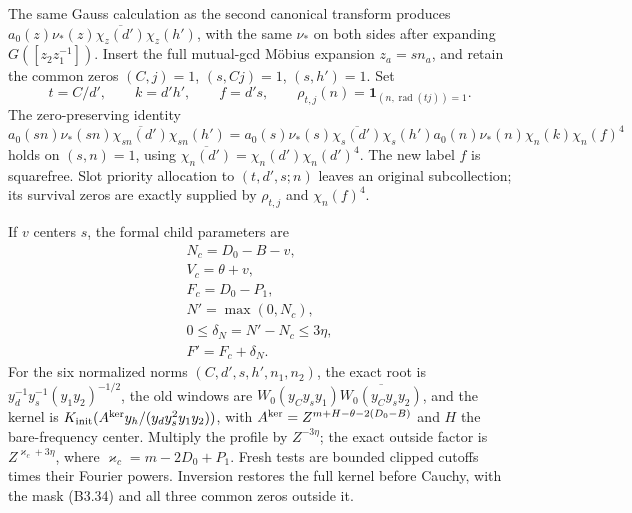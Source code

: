 \documentclass[11pt,a4paper]{article}
\begin{document}
The same Gauss calculation as the second canonical transform produces
\(a_0(z)\nu_*(z)\overline{\chi_z(d')}\chi_z(h')\), with the same
\(\nu_*\) on both sides after expanding \(G([z_2z_1^{-1}])\). Insert the
full mutual-gcd Möbius expansion \(z_a=sn_a\), and retain the common
zeros \((C,\allowbreak{}j)=1\), \((s,\allowbreak{}Cj)=1\), \((s,\allowbreak{}h')=1\). Set \[
t=C/d',\qquad k=d'h',\qquad f=d's,\qquad
\rho_{t,j}(n)=\mathbf1_{(n,\operatorname{rad}(tj))=1}.
\tag{B3.35}
\] The zero-preserving identity \[
a_0(sn)\nu_*(sn)\overline{\chi_{sn}(d')}\chi_{sn}(h')
=a_0(s)\nu_*(s)\overline{\chi_s(d')}\chi_s(h')
 a_0(n)\nu_*(n)\chi_n(k)\chi_n(f)^4
\tag{B3.36}
\] holds on \((s,\allowbreak{}n)=1\), using
\(\overline{\chi_n(d')}=\chi_n(d')\chi_n(d')^4\). The new label \(f\) is
squarefree. Slot priority allocation to \((t,\allowbreak{}d',\allowbreak{}s;n)\) leaves an
original subcollection; its survival zeros are exactly supplied by
\(\rho_{t,\allowbreak{}j}\) and \(\chi_n(f)^4\).

If \(v\) centers \(s\), the formal child parameters are \[
\begin{gathered}
N_c=D_0-B-v,\\ V_c=\theta+v,\\ F_c=D_0-P_1,
\\ N'=\max(0,N_c),\\0\le\delta_N=N'-N_c\le3\eta,
\\ F'=F_c+\delta_N.
\end{gathered}
\tag{B3.37}
\] For the six normalized norms \((C,\allowbreak{}d',\allowbreak{}s,\allowbreak{}h',\allowbreak{}n_1,\allowbreak{}n_2)\), the exact root
is \(y_d^{-1}y_s^{-1}(y_1y_2)^{-1/2}\), the old windows are
\(W_0(y_Cy_sy_1)\overline{W_0(y_Cy_sy_2)}\), and the kernel is
\(K_{\rm init}(A^{\rm ker}y_h/(y_dy_s^2y_1y_2))\), with
\(A^{\rm ker}=Z^{m+H-\theta-2(D_0-B)}\) and \(H\) the bare-frequency
center. Multiply the profile by \(Z^{-3\eta}\); the exact outside factor
is \(Z^{\varkappa_c+3\eta}\), where \(\varkappa_c=m-2D_0+P_1\). Fresh
tests are bounded clipped cutoffs times their Fourier powers. Inversion
restores the full kernel before Cauchy, with the mask (B3.34) and all
three common zeros outside it.
\end{document}
